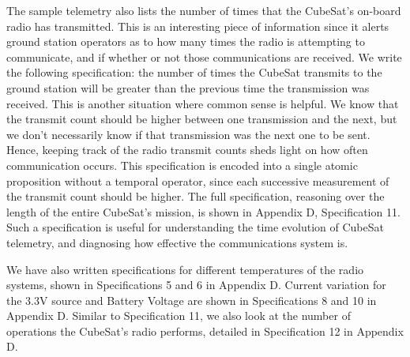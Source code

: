 \documentclass[conf]{new-aiaa}
\begin{document}
The sample telemetry also lists the number of times that the CubeSat's on-board radio has transmitted. This is an interesting piece of information since it alerts ground station operators as to how many times the radio is attempting to communicate, and if whether or not those communications are received. We write the following specification: the number of times the CubeSat transmits to the ground station will be greater than the previous time the transmission was received. This is another situation where common sense is helpful. We know that the transmit count should be higher between one transmission and the next, but we don't necessarily know if that transmission was the next one to be sent. Hence, keeping track of the radio transmit counts sheds light on how often communication occurs. This specification is encoded into a single atomic proposition without a temporal operator, since each successive measurement of the transmit count should be higher. The full specification, reasoning over the length of the entire CubeSat's mission, is shown in Appendix D, Specification 11. Such a specification is useful for understanding the time evolution of CubeSat telemetry, and diagnosing how effective the communications system is.

We have also written specifications for different temperatures of the radio systems, shown in Specifications 5 and 6 in Appendix D. Current variation for the 3.3V source and Battery Voltage are shown in Specifications 8 and 10 in Appendix D. Similar to Specification 11, we also look at the number of operations the CubeSat's radio performs, detailed in Specification 12 in Appendix D.


\end{document}
